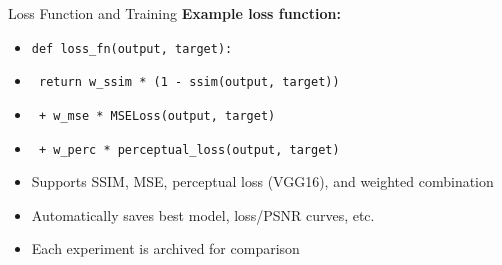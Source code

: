 \documentclass{beamer}
\begin{document}
\begin{frame}{Loss Function and Training}
\textbf{Example loss function:}
\begin{itemize}
    \item \texttt{def loss\_fn(output, target):}
    \item \texttt{\hspace{1em} return w\_ssim * (1 - ssim(output, target))}
    \item \texttt{\hspace{2em} + w\_mse * MSELoss(output, target)}
    \item \texttt{\hspace{2em} + w\_perc * perceptual\_loss(output, target)}
\end{itemize}
\vspace{0.5em}
\begin{itemize}
    \item Supports SSIM, MSE, perceptual loss (VGG16), and weighted combination
    \item Automatically saves best model, loss/PSNR curves, etc.
    \item Each experiment is archived for comparison
\end{itemize}
\end{frame}
\end{document}
